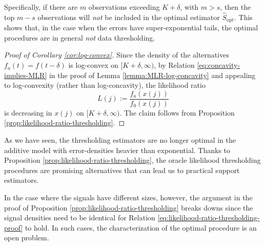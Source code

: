 Specifically, if there are $m$ observations exceeding $K+\delta$, with $m>s$, then the top $m-s$ observations will \emph{not} be included in the optimal estimator $\widehat{S}_{\text{opt}}$. This shows that, in the case when the 
errors have super-exponential tails, the optimal procedures are in general \emph{not} data thresholding.

\begin{proof}[Proof of Corollary \ref{cor:log-convex}]
Since the density of the alternatives $f_{a}(t) = {f(t-\delta)}$ is log-convex on $[K+\delta, \infty)$, by Relation \eqref{eq:concavity-implies-MLR} in the proof of Lemma \ref{lemma:MLR-log-concavity} and appealing to log-convexity (rather than log-concavity), the likelihood ratio
$$
L(j) := \frac{f_a(x(j))}{f_0(x(j))} %
$$
is decreasing in $x(j)$ on $[K+\delta, \infty)$.  The claim follows from Proposition \ref{prop:likelihood-ratio-thresholding}.
\end{proof}

\begin{remark} As we have seen, the thresholding estimators are no longer optimal 
in the additive model with error-densities heavier than exponential.   Thanks to Proposition 
\ref{prop:likelihood-ratio-thresholding}, the oracle likelihood thresholding procedures are promising alternatives
that can lead us to practical support estimators.  

In the case where the signals have different sizes, however, the argument in the proof of Proposition \ref{prop:likelihood-ratio-thresholding} breaks downs since the signal densities need to be identical for Relation \eqref{eq:likelihood-ratio-thresholding-proof} to hold.  In such cases, the characterization of the optimal procedure is an open problem.
\end{remark}








